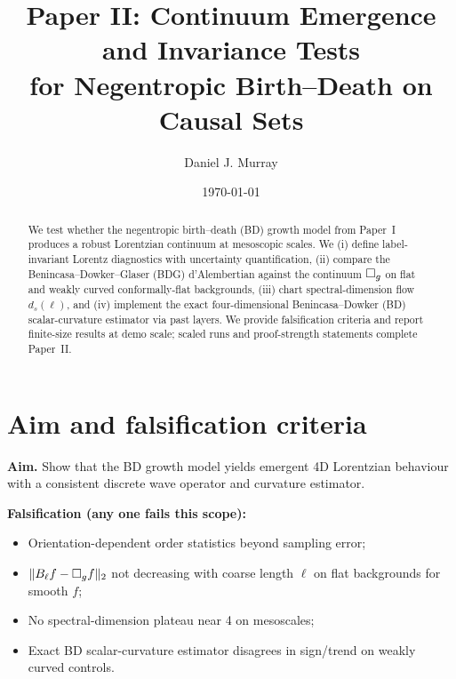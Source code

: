 \graphicspath{{figs/}{paper2/figs/}}

\makeatletter
\newcommand{\SafeGraphic}[2]{%
  \IfFileExists{#1}{%
    \texttt{[image: \#1]}%
  }{%
    \fbox{\parbox[c][2.2in][c]{#2\linewidth}{\centering\small \textsf{Figure file not found:}\\\texttt{#1}}}%
  }%
}
\makeatother

\title{Paper II: Continuum Emergence and Invariance Tests\\
for Negentropic Birth--Death on Causal Sets}
\author{Daniel J. Murray}
\date{\today}


\maketitle

\begin{abstract}
We test whether the negentropic birth--death (BD) growth model from Paper~I produces a robust Lorentzian continuum at mesoscopic scales.
We (i) define label-invariant Lorentz diagnostics with uncertainty quantification, (ii) compare the Benincasa--Dowker--Glaser (BDG) d'Alembertian against the continuum $\Box_g$ on flat and weakly curved conformally-flat backgrounds, (iii) chart spectral-dimension flow $d_s(\ell)$, and (iv) implement the exact four-dimensional Benincasa--Dowker (BD) scalar-curvature estimator via past layers.
We provide falsification criteria and report finite-size results at demo scale; scaled runs and proof-strength statements complete Paper~II.
\end{abstract}

\section{Aim and falsification criteria}
\textbf{Aim.} Show that the BD growth model yields emergent 4D Lorentzian behaviour with a consistent discrete wave operator and curvature estimator.

\medskip\noindent\textbf{Falsification (any one fails this scope):}
\begin{itemize}
\item Orientation-dependent order statistics beyond sampling error;
\item $\|B_\ell f - \Box_g f\|_2$ not decreasing with coarse length $\ell$ on flat backgrounds for smooth $f$;
\item No spectral-dimension plateau near 4 on mesoscales;
\item Exact BD scalar-curvature estimator disagrees in sign/trend on weakly curved controls.
\end{itemize}

